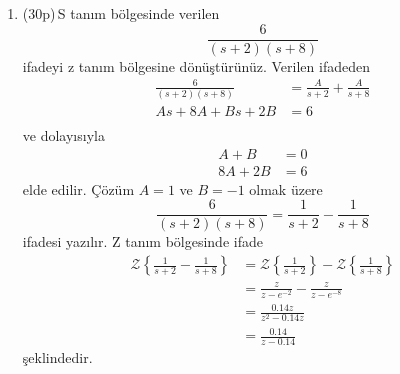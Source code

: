 \begin{enumerate}[\bfseries S1.]
    \item (30p)\,S tanım bölgesinde verilen 
    \begin{equation}
        \frac{6}{(s+2)(s+8)}
    \end{equation}
    ifadeyi z tanım bölgesine dönüştürünüz. 
    Verilen ifadeden 
    \begin{equation}
    \begin{split}
        \frac{6}{(s+2)(s+8)}&=\frac{A}{s+2}+\frac{A}{s+8}\\
        As+8A+Bs+2B&=6\\
    \end{split}
    \end{equation}
    ve dolayısıyla  
    \begin{equation}
        \begin{split}
            A+B&=0\\
            8A+2B&=6
        \end{split}
    \end{equation}
    elde edilir. Çözüm $A=1$ ve $B=-1$ olmak üzere
    \begin{equation}
        \frac{6}{(s+2)(s+8)}=\frac{1}{s+2}-\frac{1}{s+8}
    \end{equation}
    ifadesi yazılır. Z tanım bölgesinde ifade
    \begin{equation}
        \begin{split}
            \mathcal{Z}\left\{\frac{1}{s+2}-\frac{1}{s+8}\right\}&=
            \mathcal{Z}\left\{\frac{1}{s+2}\right\}-\mathcal{Z}\left\{\frac{1}{s+8}\right\}\\
            &=\frac{z}{z-e^{-2}}-\frac{z}{z-e^{-8}}\\
            &=\frac{ 0.14z}{z^2 - 0.14 z}\\
            &=\frac{ 0.14}{z- 0.14}
        \end{split}
    \end{equation}
    şeklindedir.
\end{enumerate}
